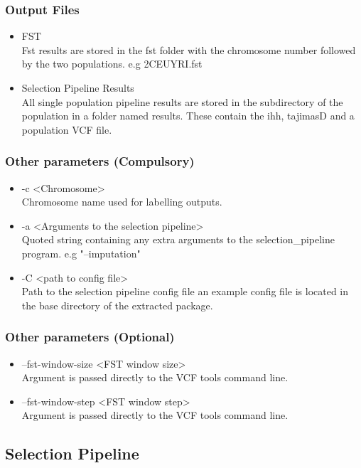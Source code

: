 \documentclass[a4paper,10pt]{article}
\begin{document}
\subsubsection{Output Files}
\begin{itemize}
\item FST \\
Fst results are stored in the fst folder with the chromosome number followed by the two populations. e.g 2CEUYRI.fst
\item Selection Pipeline Results\\
All single population pipeline results are stored in the subdirectory of the population in a folder named results. These contain the ihh, tajimasD and a population VCF file.
\end{itemize}
\subsubsection{Other parameters (Compulsory)}
\begin{itemize}
\item -c <Chromosome>\\
Chromosome name used for labelling outputs.
\item -a <Arguments to the selection pipeline>\\
Quoted string containing any extra arguments to the selection\_pipeline program. e.g "--imputation"
\item -C <path to config file>\\
Path to the selection pipeline config file an example config file is located in the base directory of the extracted package.
\end{itemize}
\subsubsection{Other parameters (Optional)}
\begin{itemize}
\item --fst-window-size <FST window size>\\
Argument is passed directly to the VCF tools command line.
\item --fst-window-step <FST window step>\\
Argument is passed directly to the VCF tools command line.
\end{itemize}
\subsection{Selection Pipeline}
\end{document}
